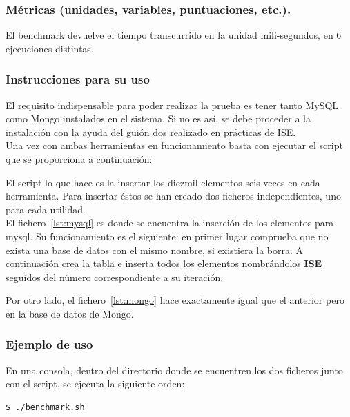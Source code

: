 \subsubsection{Métricas (unidades, variables, puntuaciones, etc.).}
El benchmark devuelve el tiempo transcurrido en la unidad mili-segundos, en 6 ejecuciones distintas.

\subsubsection{Instrucciones para su uso}

El requisito indispensable para poder realizar la prueba es tener tanto MySQL como Mongo instalados en el sistema. Si no es así, se debe proceder a la instalación con la ayuda del guión dos realizado en prácticas de ISE.
\\

Una vez con ambas herramientas en funcionamiento basta con ejecutar el script que se proporciona a continuación:



El script lo que hace es la insertar los diezmil elementos seis veces en cada herramienta. Para insertar éstos se han creado dos ficheros independientes, uno para cada utilidad. 
\\

El fichero~\ref{lst:mysql} es donde se encuentra la inserción de los elementos para mysql. Su funcionamiento es el siguiente: en primer lugar comprueba que no exista una base de datos con el mismo nombre, si existiera la borra. A continuación crea la tabla e inserta todos los elementos nombrándolos \textbf{ISE} seguidos del número correspondiente a su iteración. 



Por otro lado, el fichero~\ref{lst:mongo} hace exactamente igual que el anterior pero en la base de datos de Mongo.



\subsubsection{Ejemplo de uso}

En una consola, dentro del directorio donde se encuentren los dos ficheros junto con el script, se ejecuta la siguiente orden:
\begin{lstlisting}[style=fich]
$ ./benchmark.sh
\end{lstlisting}
\vspace{-22pt}

